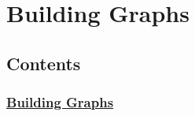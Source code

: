 


\section{Building Graphs} \label{building-graphs}

\subsection{Contents}\label{contents}

\subsubsection{\texorpdfstring{\protect\hyperlink{AUTOGENERATED-building-graphs}{Building
Graphs}}{Building Graphs}}\label{building-graphs-1}

